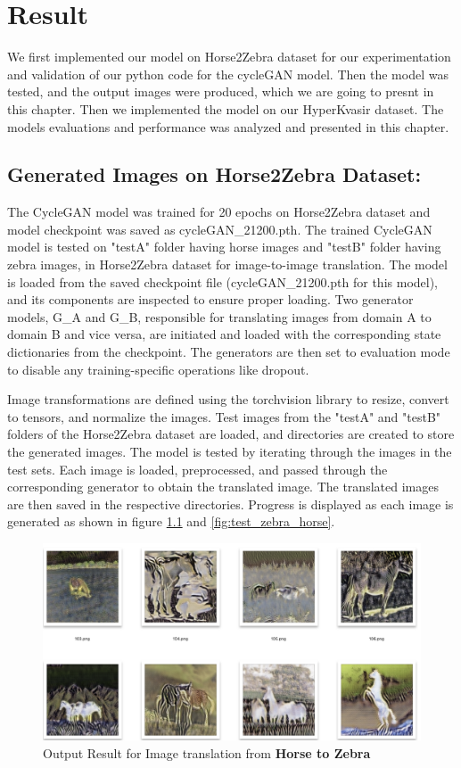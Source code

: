 \documentclass[UKenglish,12pt]{master-style}
\begin{document}
\chapter{Result}

We first implemented our model on Horse2Zebra dataset for our experimentation and validation of our python code for the cycleGAN model. Then the model was tested, and the output images were produced, which we are going to presnt in this chapter. Then we implemented the model on our HyperKvasir dataset. The models evaluations and performance was analyzed and presented in this chapter.

\section{Generated Images on Horse2Zebra Dataset:}

The CycleGAN model was trained for 20 epochs on Horse2Zebra dataset and model checkpoint was saved as cycleGAN\_21200.pth.  The trained CycleGAN model is tested on "testA" folder having horse images and "testB" folder having zebra images, in Horse2Zebra dataset for image-to-image translation. The model is loaded from the saved checkpoint file (cycleGAN\_21200.pth for this model), and its components are inspected to ensure proper loading. Two generator models, G\_A and G\_B, responsible for translating images from domain A to domain B and vice versa, are initiated and loaded with the corresponding state dictionaries from the checkpoint. The generators are then set to evaluation mode to disable any training-specific operations like dropout.

Image transformations are defined using the torchvision library to resize, convert to tensors, and normalize the images. Test images from the "testA" and "testB" folders of the Horse2Zebra dataset are loaded, and directories are created to store the generated images. The model is tested by iterating through the images in the test sets. Each image is loaded, preprocessed, and passed through the corresponding generator to obtain the translated image. The translated images are then saved in the respective directories. Progress is displayed as each image is generated as shown in figure \ref{fig:test_horse_zebra} and \ref{fig:test_zebra_horse}.


\begin{figure}[htbp]
    \centering
    \includegraphics[width=1\textwidth]{Images/test_horse_zebra.png}
    \caption{Output Result for Image translation from \textbf{Horse to Zebra}}
    \label{fig:test_horse_zebra}
\end{figure}
\end{document}
